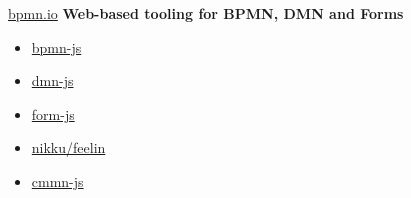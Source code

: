 \documentclass[12pt,aspectratio=169]{beamer}
\begin{document}
\begin{frame}{\href{https://bpmn.io/}{bpmn.io}}
\textbf{Web-based tooling for BPMN, DMN and Forms}
\par
\vspace{0.5cm}
\par
\begin{minipage}{0.5\textwidth}
\begin{itemize}[<+->]
    \item \href{http://demo.bpmn.io/}{bpmn-js}
    \item \href{http://demo.bpmn.io/dmn}{dmn-js}
    \item \href{http://demo.bpmn.io/form}{form-js}
    \item \href{https://nikku.github.io/feel-playground/}{nikku/feelin}
    \item \href{http://demo.bpmn.io/cmmn}{cmmn-js}
\end{itemize}
\end{minipage}
\begin{minipage}{0.45\textwidth}
\end{minipage}
\end{frame}
\end{document}
